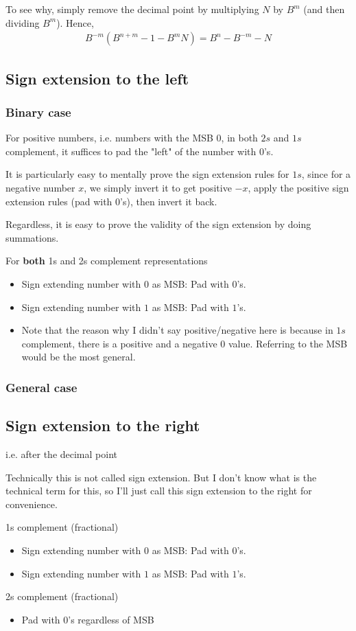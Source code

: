 \documentclass{article}
\begin{document}
To see why, simply remove the decimal point by multiplying $N$ by $B^m$ (and then dividing $B^m$).
Hence, \begin{align*}
	B^{-m}(B^{n+m} - 1 - B^mN) = B^n - B^{-m} - N
\end{align*}



\subsection{Sign extension to the left}
\subsubsection{Binary case}
For positive numbers, i.e. numbers with the MSB 0, in both $2s$ and $1s$ complement, it suffices to pad the "left" of the number with $0$'s.

It is particularly easy to mentally prove the sign extension rules for $1s$, since for a negative number $x$, we simply invert it to get positive $-x$, apply the positive sign extension rules (pad with $0$'s), then invert it back. 

Regardless, it is easy to prove the validity of the sign extension by doing summations.

For \textbf{both} 1s and 2s complement representations
\begin{itemize}
	\item Sign extending number with $0$ as MSB: Pad with $0$'s.
	\item Sign extending number with $1$ as MSB: Pad with $1$'s.
	\item Note that the reason why I didn't say positive/negative here is because in $1s$ complement, there is a positive and a negative $0$ value. Referring to the MSB would be the most general.
\end{itemize}

\subsubsection{General case}

\subsection{Sign extension to the right}
i.e. after the decimal point

Technically this is not called sign extension. But I don't know what is the technical term for this, so I'll just call this sign extension to the right for convenience.


1s complement (fractional)
\begin{itemize}
	\item Sign extending number with $0$ as MSB: Pad with $0$'s.
	\item Sign extending number with $1$ as MSB: Pad with $1$'s.
\end{itemize}

2s complement (fractional)
\begin{itemize}
	\item Pad with $0$'s regardless of MSB
\end{itemize}
\end{document}
